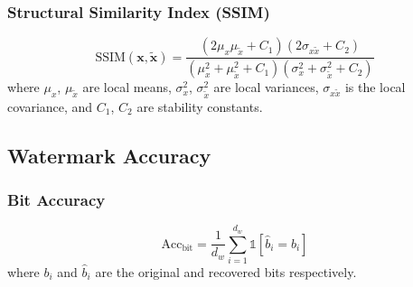 \documentclass[11pt]{article}
\begin{document}
\subsubsection{Structural Similarity Index (SSIM)}
\begin{equation}
    \text{SSIM}(\mathbf{x}, \tilde{\mathbf{x}}) = \frac{(2\mu_x\mu_{\tilde{x}} + C_1)(2\sigma_{x\tilde{x}} + C_2)}{(\mu_x^2 + \mu_{\tilde{x}}^2 + C_1)(\sigma_x^2 + \sigma_{\tilde{x}}^2 + C_2)}
\end{equation}
where $\mu_x$, $\mu_{\tilde{x}}$ are local means, $\sigma_x^2$, $\sigma_{\tilde{x}}^2$ are local variances, $\sigma_{x\tilde{x}}$ is the local covariance, and $C_1$, $C_2$ are stability constants.

\subsection{Watermark Accuracy}

\subsubsection{Bit Accuracy}
\begin{equation}
    \text{Acc}_{\text{bit}} = \frac{1}{d_w}\sum_{i=1}^{d_w} \mathbb{1}[\hat{b}_i = b_i]
\end{equation}
where $b_i$ and $\hat{b}_i$ are the original and recovered bits respectively.
\end{document}
